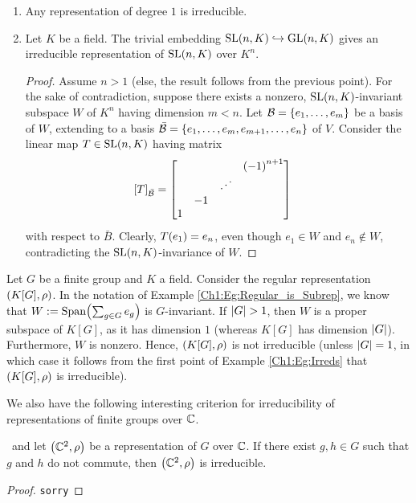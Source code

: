 \begin{boxexample} \label{Ch1:Eg:Irreds}
    \hfill
    \begin{enumerate}
        \item Any representation of degree $1$ is irreducible.
        \item Let $K$ be a field. The trivial embedding $\operatorname{SL}\!\left( n,K \right) \hookrightarrow \operatorname{GL}\!\left( n,K \right)$ gives an irreducible representation of $\operatorname{SL}\!\left( n,K \right)$ over $K^n$.
        \begin{proof}
            Assume $n > 1$ (else, the result follows from the previous point). For the sake of contradiction, suppose there exists a nonzero, $\operatorname{SL}\!\left( n,K \right)$-invariant subspace $W$ of $K^n$ having dimension $m < n$. Let $\mathcal{B} = \left\{ e_1, \ldots, e_m \right\}$ be a basis of $W$, extending to a basis $\bar{\mathcal{B}} = \left\{ e_1, \ldots, e_m, e_{m+1}, \ldots, e_n \right\}$ of $V$. Consider the linear map $T \in \operatorname{SL}\!\left( n,K \right)$ having matrix
            \begin{align*}
                \left[ T \right]_{\bar{\mathcal{B}}} &=
                \begin{bmatrix}
                    & & & \left( -1 \right)^{n+1} \\
                    & & \iddots & \\
                    & -1 & & \\
                    1 & & &
                \end{bmatrix}
            \end{align*}
            with respect to $\bar{B}$. Clearly, $T\!\left( e_1 \right) = e_n$, even though $e_1 \in W$ and $e_n \notin W$, contradicting the $\operatorname{SL}\!\left( n,K \right)$-invariance of $W$.
        \end{proof}
    \end{enumerate}
\end{boxexample}
\begin{boxnexample}
    Let $G$ be a finite group and $K$ a field. Consider the regular representation $\left( K[G], \rho \right)$. In the notation of Example \ref{Ch1:Eg:Regular_is_Subrep}, we know that $W := \operatorname{Span}\!\left( \sum_{g \in G} e_g \right)$ is $G$-invariant. If $\left\lvert G \right\rvert > 1$, then $W$ is a proper subspace of $K[G]$, as it has dimension $1$ (whereas $K[G]$ has dimension $\left\lvert G \right\rvert$). Furthermore, $W$ is nonzero. Hence, $\left( K[G], \rho \right)$ is not irreducible (unless $\left\lvert G \right\rvert = 1$, in which case it follows from the first point of Example \ref{Ch1:Eg:Irreds} that $\left( K[G], \rho \right)$ is irreducible).
\end{boxnexample}

We also have the following interesting criterion for irreducibility of representations of finite groups over $\mathbb{C}$.

\begin{lemma}
    \ and let $\left( \mathbb{C}^2, \rho \right)$ be a representation of $G$ over $\mathbb{C}$. If there exist $g, h \in G$ such that $g$ and $h$ do not commute, then $\left( \mathbb{C}^2, \rho \right)$ is irreducible.
\end{lemma}
\begin{proof}
    \verb|sorry|
\end{proof}
